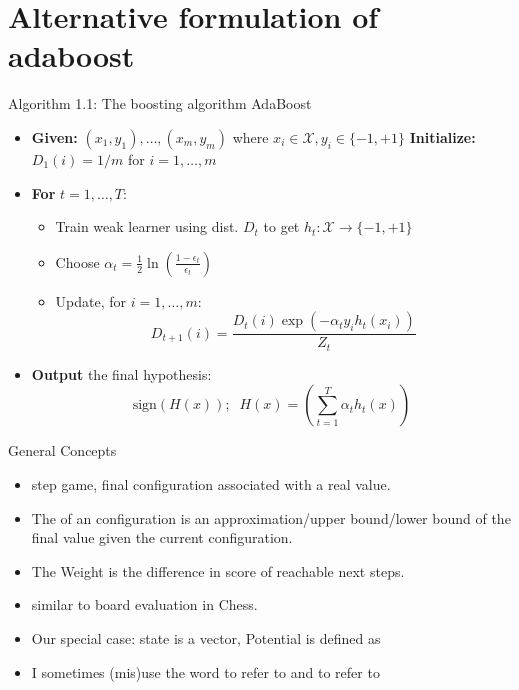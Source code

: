 \documentclass{beamer}
\begin{document}
\section{Alternative formulation of adaboost}
\begin{frame}{Algorithm 1.1: The boosting algorithm AdaBoost}
\begin{itemize}
\item \textbf{Given:} $(x_1, y_1), \ldots, (x_m, y_m)$ where $x_i \in \mathcal{X}, y_i \in \{-1,+1\}$  \textbf{Initialize:} $D_1(i) = 1/m$ for $i = 1,\ldots,m$
\item \textbf{For} $t = 1,\ldots,T$:
  \begin{itemize}
    \item Train weak learner using dist. $D_t$ to get $h_t: \mathcal{X} \to \{-1,+1\}$
    \item Choose $\alpha_t = \frac{1}{2}\ln\left(\frac{1-\epsilon_t}{\epsilon_t}\right)$
    \item Update, for $i = 1,\ldots,m$:
        \[ D_{t+1}(i) = \frac{D_t(i)\exp(-\alpha_t y_i h_t(x_i))}{Z_t} \]
      \end{itemize}
\item \textbf{Output} the final hypothesis:
    \[ \text{sign}(H(x));\;\; H(x) = \left(\sum_{t=1}^T \alpha_t h_t(x)\right) \]
  \end{itemize}
\end{frame}

\begin{frame}{General Concepts}
  \begin{itemize}
  \item {} step game, final configuration associated with a real value.
  \item The  of an configuration is an approximation/upper bound/lower  bound of the final value given the current configuration.
  \item The Weight is the difference in score of reachable next steps.
  \item similar to board evaluation in Chess.
  \item Our special case:  state is a vector, Potential is defined as
    \R{
      \[
        \Phi({\mathbf u})=\psi\left( \sum_{i=1}^n \phi(u_i)\right)
      \]}
    \item I sometimes (mis)use the word  to refer to \R{$\phi$} and  to refer to \R{$\Phi$}
\end{itemize}
\end{frame}
\end{document}
